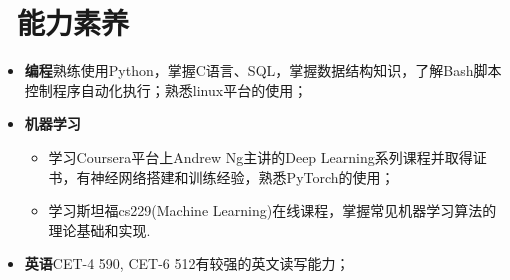 \documentclass{resume}
\begin{document}
\section{\faCogs\ 能力素养}
\begin{itemize}[parsep=0.5ex]
	\item \textbf{编程}\quad 熟练使用Python，掌握C语言、SQL，掌握数据结构知识，了解Bash脚本控制程序自动化执行；熟悉linux平台的使用；
	\item \textbf{机器学习}
	      \begin{itemize}[parsep=0.5ex,label=$\ast$]
		      \item 学习Coursera平台上Andrew Ng主讲的Deep Learning系列课程并取得证书，有神经网络搭建和训练经验，熟悉PyTorch的使用；
		      \item 学习斯坦福cs229(Machine Learning)在线课程，掌握常见机器学习算法的理论基础和实现.
	      \end{itemize}
	\item \textbf{英语}\quad CET-4 590, CET-6 512\quad 有较强的英文读写能力；
\end{itemize}
\end{document}
